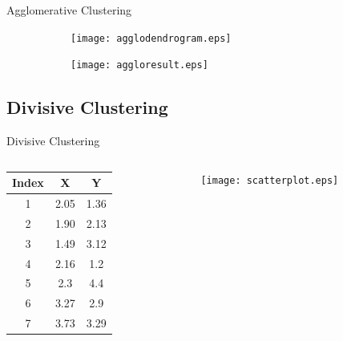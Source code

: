 \documentclass{beamer}
\begin{document}
	\begin{frame}{Agglomerative Clustering}
		\begin{figure}[htbp]
			\begin{subfigure}[b]{0.45\columnwidth}
				\centering
				\texttt{[image: agglodendrogram.eps]}
			\end{subfigure}
			\hfill
			\begin{subfigure}[b]{0.45\columnwidth}
				\centering
				\texttt{[image: aggloresult.eps]}
			\end{subfigure}
		\end{figure}
	\end{frame}
	
	\subsection{Divisive Clustering}
	\begin{frame}
		\tableofcontents
		[
		currentsection,
		currentsubsection,
		subsectionstyle=show/shaded/hide
		]
	\end{frame}
	
	\begin{frame}{Divisive Clustering}
		\begin{columns}
			\begin{column}{0.4\linewidth}
				\begin{table}[htbp]
					\centering
					\begin{tabular}{ccc}
						\toprule
						Index & X & Y\\
						\midrule
						1 & 2.05 & 1.36\\
						2 & 1.90 & 2.13\\
						3 & 1.49 & 3.12\\
						4 & 2.16 & 1.2\\
						5 & 2.3 & 4.4\\
						6 & 3.27 & 2.9\\
						7 & 3.73 & 3.29\\
						\bottomrule
					\end{tabular}
				\end{table}
			\end{column}
			\begin{column}{0.6\linewidth}
				\begin{figure}[htbp]
					\centering
					\texttt{[image: scatterplot.eps]}
				\end{figure}
			\end{column}
		\end{columns}
	\end{frame}
\end{document}

